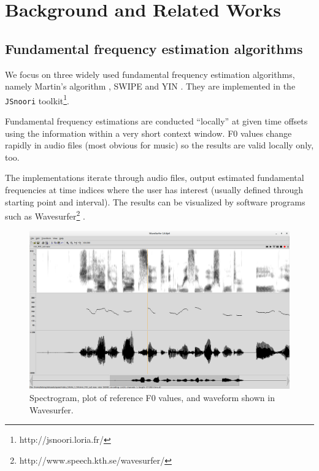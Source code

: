\documentclass[11pt,a4paper]{report}
\begin{document}
\chapter{Background and Related Works}

\section{Fundamental frequency estimation algorithms}

We focus on three widely used fundamental frequency estimation algorithms, namely Martin's algorithm \parencite{martin1982comparison}, SWIPE \parencite{camacho2007swipe} and YIN \parencite{de2002yin}.
They are implemented in the \texttt{JSnoori} toolkit\footnote{http://jsnoori.loria.fr/}.

Fundamental frequency estimations are conducted \enquote{locally} at given time offsets using the information within a very short context window.
F0 values change rapidly in audio files (most obvious for music) so the results are valid locally only, too.

The implementations iterate through audio files, output estimated fundamental frequencies at time indices where the user has interest (usually defined through starting point and interval).
The results can be visualized by software programs such as Wavesurfer\footnote{http://www.speech.kth.se/wavesurfer/} \parencite{sjolander2000wavesurfer}.

\begin{figure}[htbp]
  \centering
  \includegraphics[width=\textwidth]{wavesurfer.png}
  \caption{Spectrogram, plot of reference F0 values, and waveform shown in Wavesurfer.} \label{fig:wavesurfer}
\end{figure}
\end{document}
